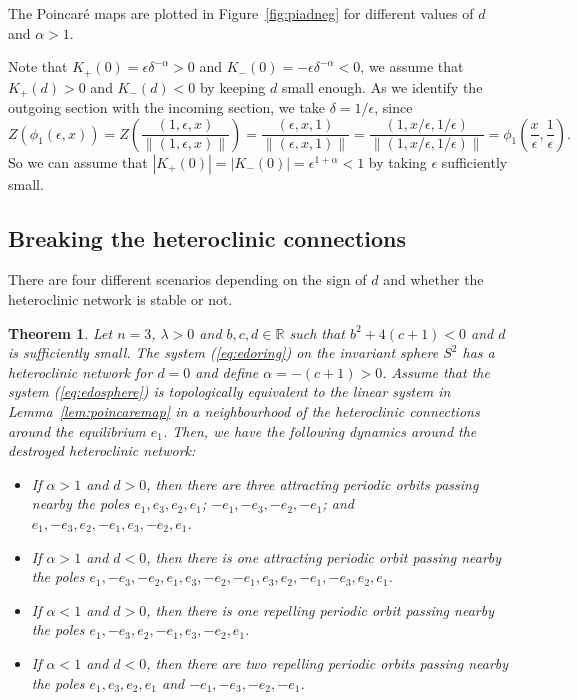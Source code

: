 \documentclass{article}
\newtheorem{theo}{Theorem}
\theoremstyle{definition}
\begin{document}
The Poincaré maps are plotted in Figure~\ref{fig:piadneg} for different values of $d$ and $\alpha>1$.


Note that $K_+(0)=\epsilon \delta^{-\alpha}>0$ and $K_-(0)=-\epsilon \delta^{-\alpha}<0$, we assume that $K_+(d)>0$ and $K_-(d)<0$ by keeping $d$ small enough. As we identify the outgoing section with the incoming section, we take $\delta=1/\epsilon$, since 
$$Z(\phi_{1}(\epsilon, x))=Z(\dfrac{(1,\epsilon, x)}{\|(1,\epsilon, x)\|})=\dfrac{(\epsilon, x, 1)}{\|(\epsilon, x, 1)\|}=\dfrac{(1, x/\epsilon, 1/\epsilon)}{\|(1, x/\epsilon, 1/\epsilon)\|}=\phi_{1}\left(\dfrac{x}{\epsilon}, \dfrac{1}{\epsilon}\right).$$
So we can assume that $|K_+(0)|=|K_-(0)|=\epsilon^{1+\alpha}<1$ by taking $\epsilon$ sufficiently small.

\subsection{Breaking the heteroclinic connections}

There are four different scenarios depending on the sign of $d$ and whether the heteroclinic network is stable or not.

\begin{theo}\label{theo:periodic_orbits}
	Let $n=3$, $\lambda>0$ and $b,c, d\in\mathbb{R}$ such that $b^2+4(c+1)<0$ and $d$ is sufficiently small.
	The system (\ref{eq:edoring}) on the invariant sphere $S^2$ has a heteroclinic network for $d=0$ and define $\alpha=-(c+1)>0$.
Assume that the system (\ref{eq:edosphere}) is topologically equivalent to the linear system in Lemma~\ref{lem:poincaremap} in a neighbourhood of the heteroclinic connections around the equilibrium $e_1$.
Then, we have the following dynamics around the destroyed heteroclinic network:
\begin{itemize}
\item If $\alpha>1$ and $d>0$, then there are three attracting periodic orbits passing nearby the poles $e_1, e_3,e_2, e_1$; $-e_1, -e_3,-e_2, -e_1$; and $e_1, -e_3, e_2, -e_1, e_3, -e_2, e_1$. 
\item If $\alpha>1$ and $d<0$, then there is one attracting periodic orbit passing nearby the poles $e_1, -e_3, -e_2, e_1,e_3, -e_2, -e_1, e_3, e_2, -e_1, -e_3, e_2, e_1$.
\item If $\alpha<1$ and $d>0$, then there is one repelling periodic orbit passing nearby the poles $e_1, -e_3, e_2, -e_1, e_3, -e_2, e_1$. 
\item If $\alpha<1$ and $d<0$, then there are two repelling periodic orbits passing nearby the poles $e_1, e_3,e_2,e_1$ and $-e_1, -e_3,-e_2,-e_1$. 
\end{itemize}
\end{theo}
\end{document}
